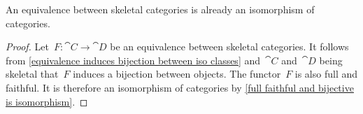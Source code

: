 \begin{corollary}
	An equivalence between skeletal categories is already an isomorphism of categories.
\end{corollary}

\begin{proof}
	Let~$F \colon \cat{C} \to \cat{D}$ be an equivalence between skeletal categories.
	It follows from \cref{equivalence induces bijection between iso classes} and~$\cat{C}$ and~$\cat{D}$ being skeletal that~$F$ induces a bijection between objects.
	The functor~$F$ is also full and faithful.
	It is therefore an isomorphism of categories by \cref{full faithful and bijective is isomorphism}.
\end{proof}
